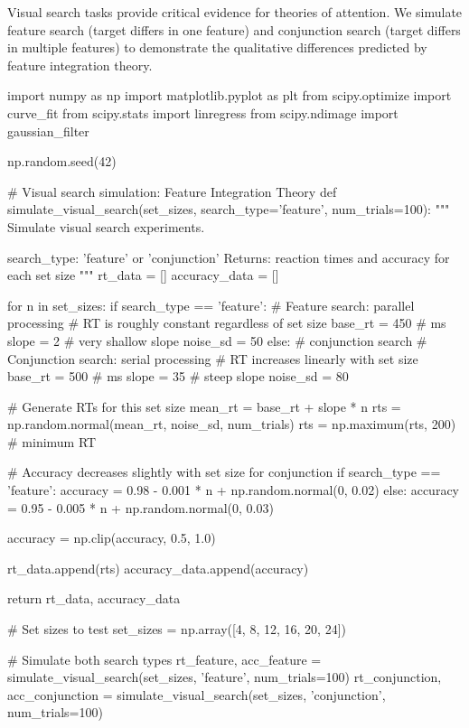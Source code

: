 \documentclass[a4paper, 11pt]{article}
\begin{document}
Visual search tasks provide critical evidence for theories of attention. We simulate feature search (target differs in one feature) and conjunction search (target differs in multiple features) to demonstrate the qualitative differences predicted by feature integration theory.

\begin{pycode}
import numpy as np
import matplotlib.pyplot as plt
from scipy.optimize import curve_fit
from scipy.stats import linregress
from scipy.ndimage import gaussian_filter

np.random.seed(42)

# Visual search simulation: Feature Integration Theory
def simulate_visual_search(set_sizes, search_type='feature', num_trials=100):
    """
    Simulate visual search experiments.

    search_type: 'feature' or 'conjunction'
    Returns: reaction times and accuracy for each set size
    """
    rt_data = []
    accuracy_data = []

    for n in set_sizes:
        if search_type == 'feature':
            # Feature search: parallel processing
            # RT is roughly constant regardless of set size
            base_rt = 450  # ms
            slope = 2      # very shallow slope
            noise_sd = 50
        else:  # conjunction search
            # Conjunction search: serial processing
            # RT increases linearly with set size
            base_rt = 500  # ms
            slope = 35     # steep slope
            noise_sd = 80

        # Generate RTs for this set size
        mean_rt = base_rt + slope * n
        rts = np.random.normal(mean_rt, noise_sd, num_trials)
        rts = np.maximum(rts, 200)  # minimum RT

        # Accuracy decreases slightly with set size for conjunction
        if search_type == 'feature':
            accuracy = 0.98 - 0.001 * n + np.random.normal(0, 0.02)
        else:
            accuracy = 0.95 - 0.005 * n + np.random.normal(0, 0.03)

        accuracy = np.clip(accuracy, 0.5, 1.0)

        rt_data.append(rts)
        accuracy_data.append(accuracy)

    return rt_data, accuracy_data

# Set sizes to test
set_sizes = np.array([4, 8, 12, 16, 20, 24])

# Simulate both search types
rt_feature, acc_feature = simulate_visual_search(set_sizes, 'feature', num_trials=100)
rt_conjunction, acc_conjunction = simulate_visual_search(set_sizes, 'conjunction', num_trials=100)


\end{pycode}
\end{document}
